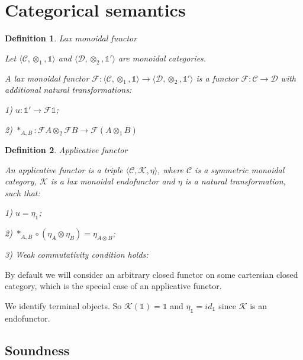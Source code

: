 \documentclass[a4paper]{article}
\newtheorem{defin}{Definition}
\begin{document}
\section{Categorical semantics}

\begin{defin} Lax monoidal functor

  Let $\langle \mathcal{C}, \otimes_1, \mathds{1} \rangle$ and $\langle \mathcal{D}, \otimes_2, \mathds{1}' \rangle$ are monoidal categories.

  A lax monoidal functor $\mathcal{F} : \langle \mathcal{C}, \otimes_1, \mathds{1} \rangle \to \langle \mathcal{D}, \otimes_2, \mathds{1}' \rangle$ is a functor
  $\mathcal{F} : \mathcal{C} \to \mathcal{D}$ with additional natural transformations:

  1) $u : \mathds{1}' \to \mathcal{F}\mathds{1}$;

  2) $\ast_{A, B} : \mathcal{F}A \otimes_2 \mathcal{F}B \to \mathcal{F}(A \otimes_1 B)$

\end{defin}

\begin{defin} Applicative functor

  An applicative functor is a triple $\langle \mathcal{C}, \mathcal{K}, \eta \rangle$,
where $\mathcal{C}$ is a symmetric monoidal category, $\mathcal{K}$ is a lax monoidal endofunctor and $\eta$ is a natural transformation, such that:

1) $u = \eta_{\mathds{1}}$;

2) $\ast_{A,B} \circ (\eta_A \otimes \eta_B) = \eta_{A \otimes B}$;

3) Weak commutativity condition holds:

\end{defin}

By default we will consider an arbitrary closed functor on some cartersian closed category, which is the special case of an applicative functor.

We identify terminal objects. So $\mathcal{K}(\mathds{1}) = \mathds{1}$ and $\eta_{\mathds{1}} = id_{\mathds{1}}$ since $\mathcal{K}$ is an endofunctor.

\subsection{Soundness}
\end{document}
